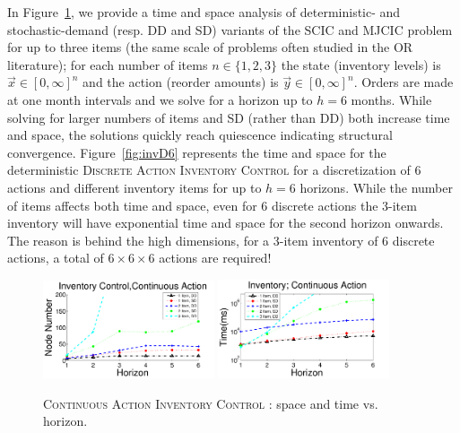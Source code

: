 \documentclass[twoside,11pt]{article}
\newcommand{\InventoryControl}{\textsc{Inventory Control }}
\begin{document}
In Figure~\ref{fig:invC}, we provide a time and space analysis of
deterministic- and stochastic-demand (resp. DD and SD) variants of the
SCIC and MJCIC problem for up to three items (the same scale of
problems often studied in the OR literature); for each number of items
$n \in \{ 1,2,3 \}$ the state (inventory levels) is $\vec{x} \in
[0,\infty]^n$ and the action (reorder amounts) is $\vec{y} \in
[0,\infty]^n$.  Orders are made at one month intervals and we solve
for a horizon up to $h=6$ months.  
While solving for larger numbers of
items and SD (rather than DD) both increase time and space, 
the solutions quickly reach quiescence indicating structural
convergence.
Figure~\ref{fig:invD6} represents the time and space for the deterministic \textsc{Discrete Action} \InventoryControl for a discretization of 6 actions and different inventory items for up to $h=6$ horizons. While the number of items affects both time and space, even for 6 discrete actions the 3-item inventory will have exponential time and space for the second horizon onwards. The reason is behind the high dimensions, for a 3-item inventory of 6 discrete actions, a total of $6 \times 6 \times 6$ actions are required!
\begin{figure}[tbp!]
\vspace{-2mm}
\centering
\includegraphics[width=0.45\textwidth]{Figures2/camdp/invCNode.pdf}
\hspace{2mm}
\includegraphics[width=0.45\textwidth]{Figures2/camdp/invCTime.pdf}
\vspace{-2mm}
\caption{%
\textsc{Continuous Action} \InventoryControl: space and time vs. horizon.
}
\label{fig:invC}
\vspace{-2mm}
\end{figure}
\end{document}
